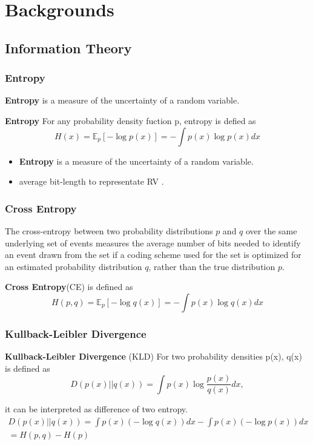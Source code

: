 \documentclass[aspectratio=169]{beamer}
\begin{document}
\section{Backgrounds}
\subsection{Information Theory}
\begin{frame}
	\frametitle{Entropy}
	\textbf{Entropy} is a measure of the uncertainty of a random variable.
	\begin{definition}
		\textbf{Entropy} For any probability density fuction p, entropy is defied as
		\begin{equation*}H(x) = \mathbb{E}_p [-\log p(x)] = - \int {p(x)\log{p(x)}dx}\end{equation*}
	\end{definition}
	\begin{itemize}
		\item \textbf{Entropy} is a measure of the uncertainty of a random variable.
		\item average bit-length to representate RV \cite{shannon1948mathematical}.
	\end{itemize}
\end{frame}

\begin{frame}
	\frametitle{Cross Entropy}
	The cross-entropy between two probability distributions $p$ and $q$
	over the same underlying set of events measures
	the average number of bits needed to identify an event
	drawn from the set if a coding scheme used for the set
	is optimized for an estimated probability distribution $q$, rather than the true distribution $p$.
	\begin{definition}
		\textbf{Cross Entropy}(CE) is defined as 
		\begin{equation*}H(p, q) = \mathbb{E}_p [-\log q(x)] = - \int p(x) \log q(x)dx\end{equation*}
	\end{definition}
	\end{frame}

\begin{frame}
	\frametitle{Kullback-Leibler Divergence}
	\begin{definition}
		\textbf{Kullback-Leibler Divergence} (KLD) For two probability densities p(x), q(x) is defined as
		\begin{equation*}D(p(x)||q(x))
			= \int p(x) \log \frac{p(x)}{q(x)}dx,\end{equation*}
	\end{definition}
	it can be interpreted as difference of two entropy.
	\begin{align*}
		D(p(x)||q(x)) = \int p(x) (-\log{q(x)})dx - \int p(x) (-\log{p(x)})dx \\
		= H(p, q) - H(p)
	\end{align*}
\end{frame}
\end{document}
